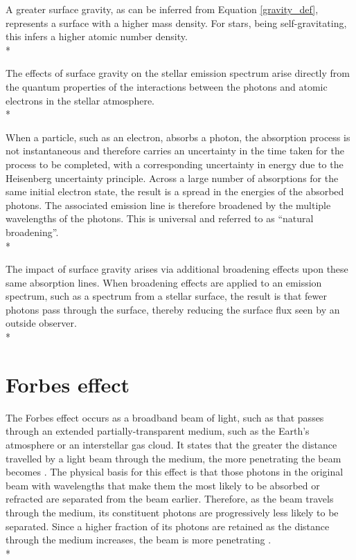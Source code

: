 \documentclass[12pt, a4paper]{report}
\begin{document}
A greater surface gravity, as can be inferred from Equation \ref{gravity_def}, represents a surface with a higher mass density. For stars, being self-gravitating, this infers a higher atomic number density.  \\*


The effects of surface gravity on the stellar emission spectrum arise directly from the quantum properties of the interactions between the photons and atomic electrons in the stellar atmosphere.\\*

When a particle, such as an electron, absorbs a photon, the absorption process is not instantaneous and therefore carries an uncertainty in the time taken for the process to be completed, with a corresponding uncertainty in energy due to the Heisenberg uncertainty principle. Across a large number of absorptions for the same initial electron state, the result is a spread in the energies of the absorbed photons. The associated emission line is therefore broadened by the multiple wavelengths of the photons. This is universal and referred to as ``natural broadening''.\\*

The impact of surface gravity arises via additional broadening effects upon these same absorption lines. When broadening effects are applied to an emission spectrum, such as a spectrum from a stellar surface, the result is that fewer photons pass through the surface, thereby reducing the surface flux seen by an outside observer. \\*

\section{Forbes effect} \label{forbes}
The Forbes effect occurs as a broadband beam of light, such as that passes through an extended partially-transparent medium, such as the Earth's atmosphere or an interstellar gas cloud. It states that the greater the distance travelled by a light beam through the medium, the more penetrating the beam becomes \citep{1842RSPT..132..225F}. The physical basis for this effect is that those photons in the original beam with wavelengths that make them the most likely to be absorbed or refracted are separated from the beam earlier. Therefore, as the beam travels through the medium, its constituent photons are progressively less likely to be separated. Since a higher fraction of its photons are retained as the distance through the medium increases, the beam is more penetrating \citep{OHVRIL1999305}.\\*
\end{document}
